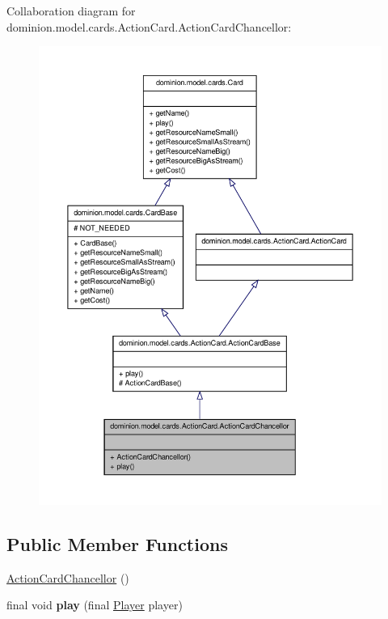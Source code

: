 \-Collaboration diagram for dominion.\-model.\-cards.\-Action\-Card.\-Action\-Card\-Chancellor\-:
\nopagebreak
\begin{figure}[H]
\begin{center}
\leavevmode
\includegraphics[width=350pt]{classdominion_1_1model_1_1cards_1_1ActionCard_1_1ActionCardChancellor__coll__graph}
\end{center}
\end{figure}
\subsection*{\-Public \-Member \-Functions}
\begin{DoxyCompactItemize}
\item 
\hyperlink{classdominion_1_1model_1_1cards_1_1ActionCard_1_1ActionCardChancellor_a7d872d152f6a5910c9d27290b23ac581}{\-Action\-Card\-Chancellor} ()
\item 
\hypertarget{classdominion_1_1model_1_1cards_1_1ActionCard_1_1ActionCardChancellor_a2b202eab608d55b01abb51ab3545530b}{final void {\bfseries play} (final \hyperlink{interfacedominion_1_1model_1_1Player}{\-Player} player)}\label{classdominion_1_1model_1_1cards_1_1ActionCard_1_1ActionCardChancellor_a2b202eab608d55b01abb51ab3545530b}

\end{DoxyCompactItemize}


